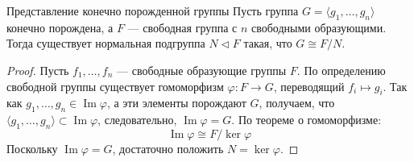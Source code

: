 \begin{Proposition}{Представление конечно порожденной группы}{}
	Пусть группа $G = \langle g_1, \dots, g_n \rangle$ конечно порождена, а $F$ — свободная группа с $n$ свободными образующими.
	Тогда существует нормальная подгруппа $N \triangleleft F$ такая, что $G \cong F/N$.
\end{Proposition}

\begin{proof}
	Пусть $f_1, \dots, f_n$ — свободные образующие группы $F$. По определению свободной группы существует гомоморфизм $\varphi: F \to G$, переводящий $f_i \mapsto g_i$.
	Так как $g_1, \dots, g_n \in \operatorname{Im} \varphi$, а эти элементы порождают $G$, получаем, что $\langle g_1, \dots, g_n \rangle \subset \operatorname{Im} \varphi$, следовательно, $\operatorname{Im} \varphi = G$.
	По теореме о гомоморфизме:
	\[ \operatorname{Im} \varphi \cong F / \ker \varphi \]
	Поскольку $\operatorname{Im} \varphi = G$, достаточно положить $N = \ker \varphi$.
\end{proof}
